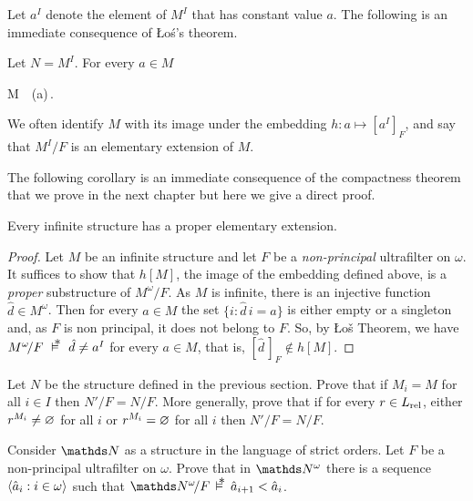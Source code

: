 Let \emph{$a^I$\/} denote the element of $M^I$ that has constant value $a$. The following is an immediate consequence of \L o\'{s}'s theorem.

\begin{corollary}\label{ultrapotenzeelementari}
Let $N=M^I$. For every $a\in M$

%
{\IFF}%
{M\ \models\ \phi(a)\,.}
\end{corollary}

We often identify $M$ with its image under the embedding $h:a\mapsto [a^I]_F$, and say that $M^I/F$ is an elementary extension of $M$.

The following corollary is an immediate consequence of the compactness theorem that we prove in the next chapter but here we give a direct proof.

\begin{corollary}
Every infinite structure has a proper elementary extension.
\end{corollary}

\begin{proof}
Let $M$ be an infinite structure and let $F$ be a \textit{non-principal\/} ultrafilter on $\omega$.
It suffices to show that $h[M]$, the image of the embedding defined above, is a \textit{proper\/} substructure of $M^\omega\!/F$. 
As $M$ is infinite, there is an injective function  $\hat d\in M^\omega$.
Then for every $a\in M$ the set $\big\{i:\hat d\,i=a\big\}$ is either empty or a singleton and, as $F$ is non principal, it does not belong to $F$.
So, by \L o\v{s} Theorem, we have $M^\omega\!/F\ \pmodels\ \hat d\neq a^I$ for every $a\in M$, that is, $[\hat d\,]_F\notin h[M]$.
\end{proof}

\begin{exercise}\label{ex_N_vs_N}
  Let $N$ be the structure defined in the previous section.
  Prove that if $M_i=M$ for all $i\in I$ then $N'/F=N/F$. 
  More generally, prove that if for every $r\in L_{\rm rel}$, either $r^{M_i}\neq\varnothing$ for all $i$ or $r^{M_i}=\varnothing$ for all $i$ then $N'/F=N/F$.
\end{exercise}

\begin{exercise}
Consider $\NN$ as a structure in the language of strict orders. 
Let $F$ be a non-principal ultrafilter on $\omega$.
Prove that in $\NN^\omega$ there is a sequence $\langle\hat a_i: i\in\omega\rangle$ such that $\NN^\omega\!/F\,\pmodels\,\hat a_{i+1}<\hat a_i$. 
\end{exercise}

